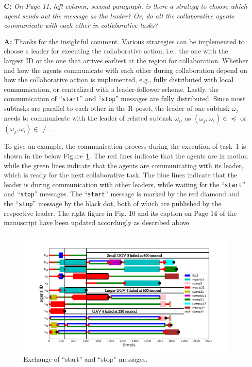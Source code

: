 \documentclass[10pt]{article}
\begin{document}
\textbf{C:}
\emph{On Page 11, left column, second paragraph, is there a strategy to
	choose which agent sends out the message as the leader? Or, do all the
	collaborative agents communicate with each other in collaborative
	tasks?
}

\textbf{A:} Thanks for the insightful comment.
Various strategies can be implemented to choose a leader for executing the collaborative action,
i.e., the one with the largest ID or the one that arrives earliest at the region for collaboration.
Whether and how the agents communicate with each other during collaboration depend on
how the collaborative action is implemented, e.g., fully distributed with local communication,
or centralized with a leader-follower scheme.
Lastly, the communication of ``\texttt{start}'' and
``\texttt{stop}'' messages are fully distributed.
Since most subtasks are parallel to each other in the R-poset,
the leader of one subtask $\omega_j$ needs to communicate
with the leader of related subtask $\omega_i$, as $(\omega_j,\omega_i)\in\preceq$ or $(\omega_j,\omega_i)\in\neq$.

To give an example,
the communication process during the execution of task~1 is shown in the below Figure~\ref{fig:communicate}.
The red lines indicate that the agents are in motion
while the green lines indicate that the agents are communicating with its leader, which is ready for the next collaborative task.
The blue lines indicate that the leader is during communication with other leaders,
while waiting for the ``\texttt{start}'' and ``\texttt{stop}'' messages.
The ``\texttt{start}'' message is marked by the red diamond and
the ``\texttt{stop}'' message by the black dot, both of which are published by the respective leader.
The right figure in Fig. 10 and its caption on Page 14 of the manuscript have been updated accordingly as described above.
\begin{figure}[ht]
 	\centering
 	\includegraphics[scale=0.20]{figs/gantt_communicate1.pdf}
 	\caption{Exchange of ``start'' and ``stop'' messages.}
 	\label{fig:communicate}
\end{figure}
\end{document}
